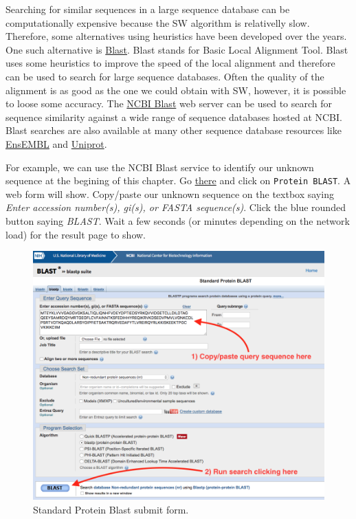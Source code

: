\documentclass[]{book}
\theoremstyle{definition}
\theoremstyle{definition}
\theoremstyle{definition}
\theoremstyle{remark}
\begin{document}
Searching for similar sequences in a large sequence database can be
computationally expensive because the SW algorithm is relativelly slow.
Therefore, some alternatives using heuristics have been developed over
the years. One such alternative is
\href{https://en.wikipedia.org/wiki/BLAST}{Blast}. Blast stands for
Basic Local Alignment Tool. Blast uses some heuristics to improve the
speed of the local alignment and therefore can be used to search for
large sequence databases. Often the quality of the alignment is as good
as the one we could obtain with SW, however, it is possible to loose
some accuracy. The \href{https://www.ncbi.nlm.nih.gov/BLAST}{NCBI Blast}
web server can be used to search for sequence similarity against a wide
range of sequence databases hosted at NCBI. Blast searches are also
available at many other sequence database resources like
\href{https://www.ensembl.org/Multi/Tools/Blast?db=core}{EnsEMBL} and
\href{http://www.uniprot.org/blast/}{Uniprot}.

For example, we can use the NCBI Blast service to identify our unknown
sequence at the begining of this chapter. Go
\href{https://www.ncbi.nlm.nih.gov/BLAST}{there} and click on
\texttt{Protein\ BLAST}. A web form will show. Copy/paste our unknown
sequence on the textbox saying \emph{Enter accession number(s), gi(s),
or FASTA sequence(s)}. Click the blue rounded button saying
\emph{BLAST}. Wait a few seconds (or minutes depending on the network
load) for the result page to show.

\begin{figure}
\includegraphics[width=13.64in]{pic/blast_submit} \caption{Standard Protein Blast submit form.}\label{fig:unnamed-chunk-6}
\end{figure}
\end{document}
